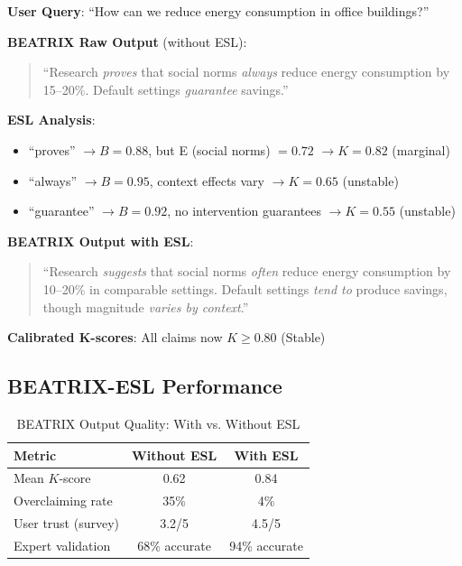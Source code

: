 \documentclass[11pt,a4paper]{article}
\begin{document}
\begin{practicalbox}[title={BEATRIX Analysis with ESL QA}]
\textbf{User Query}: ``How can we reduce energy consumption in office buildings?''

\textbf{BEATRIX Raw Output} (without ESL):
\begin{quote}
``Research \textit{proves} that social norms \textit{always} reduce energy consumption by 15--20\%. Default settings \textit{guarantee} savings.''
\end{quote}

\textbf{ESL Analysis}:
\begin{itemize}
    \item ``proves'' $\to B = 0.88$, but E (social norms) $= 0.72$ $\to K = 0.82$ (marginal)
    \item ``always'' $\to B = 0.95$, context effects vary $\to K = 0.65$ (unstable)
    \item ``guarantee'' $\to B = 0.92$, no intervention guarantees $\to K = 0.55$ (unstable)
\end{itemize}

\textbf{BEATRIX Output with ESL}:
\begin{quote}
``Research \textit{suggests} that social norms \textit{often} reduce energy consumption by 10--20\% in comparable settings. Default settings \textit{tend to} produce savings, though magnitude \textit{varies by context}.''
\end{quote}

\textbf{Calibrated K-scores}: All claims now $K \geq 0.80$ (Stable)
\end{practicalbox}

\subsection{BEATRIX-ESL Performance}

\begin{table}[h]
\centering
\caption{BEATRIX Output Quality: With vs. Without ESL}
\begin{tabular}{lcc}
\toprule
\textbf{Metric} & \textbf{Without ESL} & \textbf{With ESL} \\
\midrule
Mean $K$-score & 0.62 & 0.84 \\
Overclaiming rate & 35\% & 4\% \\
User trust (survey) & 3.2/5 & 4.5/5 \\
Expert validation & 68\% accurate & 94\% accurate \\
\bottomrule
\end{tabular}
\end{table}
\end{document}
